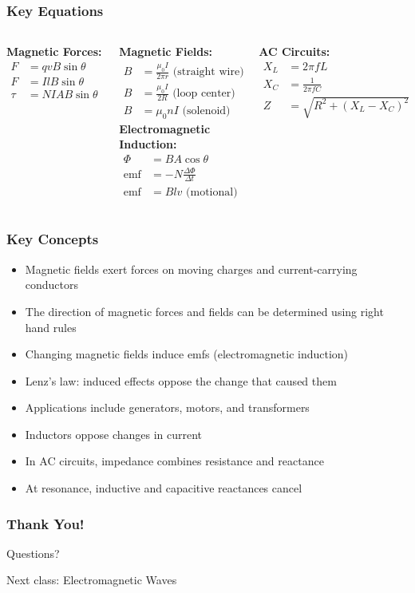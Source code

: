 \documentclass{beamer}
\begin{document}
\begin{frame}
\frametitle{Key Equations}
\begin{columns}
\textbf{Magnetic Forces:}
\begin{align}
F &= qvB\sin\theta \\
F &= IlB\sin\theta \\
\tau &= NIAB\sin\theta
\end{align}

\textbf{Magnetic Fields:}
\begin{align}
B &= \frac{\mu_0I}{2\pi r} \text{ (straight wire)} \\
B &= \frac{\mu_0I}{2R} \text{ (loop center)} \\
B &= \mu_0nI \text{ (solenoid)}
\end{align}
\textbf{Electromagnetic Induction:}
\begin{align}
\Phi &= BA\cos\theta \\
\text{emf} &= -N\frac{\Delta\Phi}{\Delta t} \\
\text{emf} &= Blv \text{ (motional)}
\end{align}

\textbf{AC Circuits:}
\begin{align}
X_L &= 2\pi fL \\
X_C &= \frac{1}{2\pi fC} \\
Z &= \sqrt{R^2 + (X_L - X_C)^2}
\end{align}
\end{columns}
\end{frame}

\begin{frame}
\frametitle{Key Concepts}
\begin{itemize}
    \item Magnetic fields exert forces on moving charges and current-carrying conductors
    \item The direction of magnetic forces and fields can be determined using right hand rules
    \item Changing magnetic fields induce emfs (electromagnetic induction)
    \item Lenz's law: induced effects oppose the change that caused them
    \item Applications include generators, motors, and transformers
    \item Inductors oppose changes in current
    \item In AC circuits, impedance combines resistance and reactance
    \item At resonance, inductive and capacitive reactances cancel
\end{itemize}
\end{frame}

\begin{frame}
\frametitle{Thank You!}
\begin{center}
\Large{Questions?}

\vspace{1cm}
\normalsize{Next class: Electromagnetic Waves}
\end{center}
\end{frame}
\end{document}
